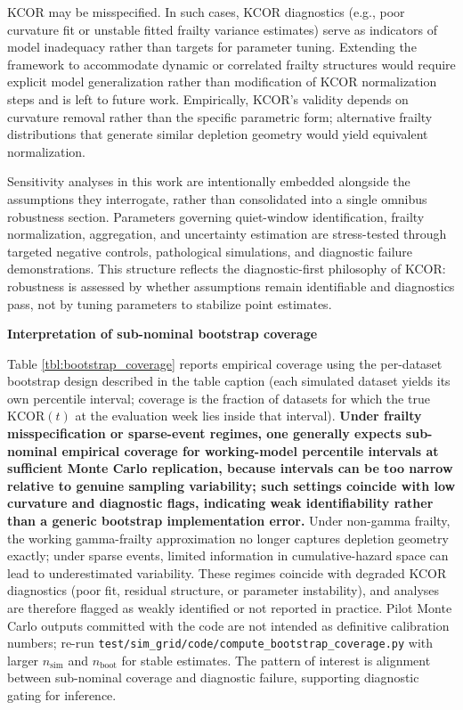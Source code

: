 \documentclass[
]{article}
\begin{document}
\begin{itemize}
  KCOR may be misspecified. In such cases, KCOR diagnostics (e.g., poor
  curvature fit or unstable fitted frailty variance estimates) serve as
  indicators of model inadequacy rather than targets for parameter
  tuning. Extending the framework to accommodate dynamic or correlated
  frailty structures would require explicit model generalization rather
  than modification of KCOR normalization steps and is left to future
  work. Empirically, KCOR's validity depends on curvature removal rather
  than the specific parametric form; alternative frailty distributions
  that generate similar depletion geometry would yield equivalent
  normalization.
\end{itemize}

Sensitivity analyses in this work are intentionally embedded alongside
the assumptions they interrogate, rather than consolidated into a single
omnibus robustness section. Parameters governing quiet-window
identification, frailty normalization, aggregation, and uncertainty
estimation are stress-tested through targeted negative controls,
pathological simulations, and diagnostic failure demonstrations. This
structure reflects the diagnostic-first philosophy of KCOR: robustness
is assessed by whether assumptions remain identifiable and diagnostics
pass, not by tuning parameters to stabilize point estimates.

\textbf{Interpretation of sub-nominal bootstrap coverage}

Table \ref{tbl:bootstrap_coverage} reports empirical coverage using the
per-dataset bootstrap design described in the table caption (each simulated
dataset yields its own percentile interval; coverage is the fraction of
datasets for which the true $\mathrm{KCOR}(t)$ at the evaluation week lies
inside that interval). \textbf{Under frailty misspecification or sparse-event
regimes, one generally expects sub-nominal empirical coverage for
working-model percentile intervals at sufficient Monte Carlo replication,
because intervals can be too narrow relative to genuine sampling
variability; such settings coincide with low curvature and diagnostic
flags, indicating weak identifiability rather than a generic bootstrap
implementation error.} Under non-gamma frailty, the working gamma-frailty
approximation no longer captures depletion geometry exactly; under sparse
events, limited information in cumulative-hazard space can lead to
underestimated variability. These regimes coincide with degraded KCOR
diagnostics (poor fit, residual structure, or parameter instability), and
analyses are therefore flagged as weakly identified or not reported in
practice. Pilot Monte Carlo outputs committed with the code are not
intended as definitive calibration numbers; re-run
\texttt{test/sim\_grid/code/compute\_bootstrap\_coverage.py} with larger
$n_{\mathrm{sim}}$ and $n_{\mathrm{boot}}$ for stable estimates. The
pattern of interest is alignment between sub-nominal coverage and
diagnostic failure, supporting diagnostic gating for inference.
\end{document}
